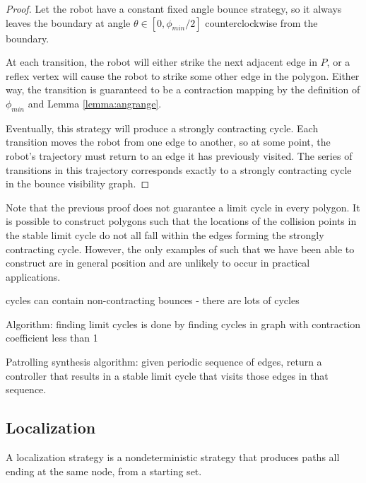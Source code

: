 \documentclass[]{svproc}  %
\begin{document}
\begin{proof}

Let the robot have a constant fixed angle bounce strategy, so it always leaves
the boundary at angle $\theta \in [0,\phi_{min}/2]$ counterclockwise from the
boundary.

At each transition, the robot will either strike the next adjacent edge in
$P$, or a reflex vertex will cause the robot to strike some other edge in the
polygon. Either way, the transition is guaranteed to be a contraction mapping by
the definition of $\phi_{min}$ and Lemma \ref{lemma:angrange}.

Eventually, this strategy will produce a strongly contracting cycle. Each
transition moves the robot from one edge to another, so at some point, the
robot's trajectory must return to an edge it has previously visited. The series
of transitions in this trajectory corresponds exactly to a strongly contracting
cycle in the bounce visibility graph.

\end{proof}

Note that the previous proof does not guarantee a limit cycle in every polygon.
It is possible to construct polygons such that the locations of the collision
points in the stable limit cycle do not all fall within the edges forming the
strongly contracting cycle. However, the only examples of such that we have been
able to construct are in general position and are unlikely to occur in practical
applications.

\begin{lemma}
cycles can contain non-contracting bounces - there are lots of cycles
\end{lemma}

Algorithm: finding limit cycles is done by finding cycles in graph with
contraction coefficient less than 1


Patrolling synthesis algorithm: given periodic sequence of edges, return a controller that
results in a stable limit cycle that visits those edges in that sequence.

\subsection{Localization}

\begin{definition}
A localization strategy is a nondeterministic strategy that produces paths all
ending at the same node, from a starting set.
\end{definition}
\end{document}
